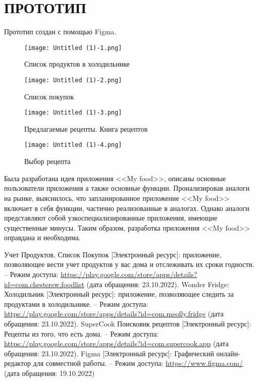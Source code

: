 \documentclass[14pt]{extreport}
\begin{document}
\chapter{ПРОТОТИП}

Прототип создан с помощью Figma. \cite{bib4}
\begin{figure}[H]
\centerline{\texttt{[image: Untitled (1)-1.png]}}
\caption{Список продуктов в холодильнике}
\label{r1}
\end{figure}

\begin{figure}[H]
\centerline{\texttt{[image: Untitled (1)-2.png]}}
\caption{Список покупок}
\label{r2}
\end{figure}

\begin{figure}[H]
\centerline{\texttt{[image: Untitled (1)-3.png]}}
\caption{Предлагаемые рецепты. Книга рецептов}
\label{r3}
\end{figure}

\begin{figure}[H]
\centerline{\texttt{[image: Untitled (1)-4.png]}}
\caption{Выбор рецепта}
\label{r4}
\end{figure}
\conclusions

Была разработана идея приложения <<My food>>, описаны основные пользователи приложения а также основные функции. Пронализировав аналоги на рынке, выяснилось, что запланированное приложение <<My food>> включает в себя функции, частично реализованные в аналогах. Однако аналоги представляют собой узкоспециализированные приложения, имеющие существенные минусы. Таким образом, разработка приложения <<My food>> оправдана и необходима.
\newpage
\begin{thebibliography}{}
 Учет Продуктов, Список Покупок [Электронный ресурс]:  приложение, позволяющее вести учет продуктов у вас дома и отслеживать их сроки годности. – Режим доступа: \url{https://play.google.com/store/apps/details?id=com.chestersw.foodlist} (дата обращения: 23.10.2022).
 Wonder Fridge: Холодильник [Электронный ресурс]:  приложение, позволяющее следить за продуктами в холодильнике. – Режим доступа: \url{https://play.google.com/store/apps/details?id=com.meolly.fridge} (дата обращения: 23.10.2022).
 SuperCook Поисковик рецептов [Электронный ресурс]:  Рецепты из того, что есть дома. – Режим доступа: \url{https://play.google.com/store/apps/details?id=com.supercook.app} (дата обращения: 23.10.2022).
 Figma [Электронный ресурс]: Графический онлайн-редактор для совместной работы. – Режим доступа: \url{https://www.figma.com/} (дата обращения: 19.10.2022)
\end{thebibliography}
\end{document}
